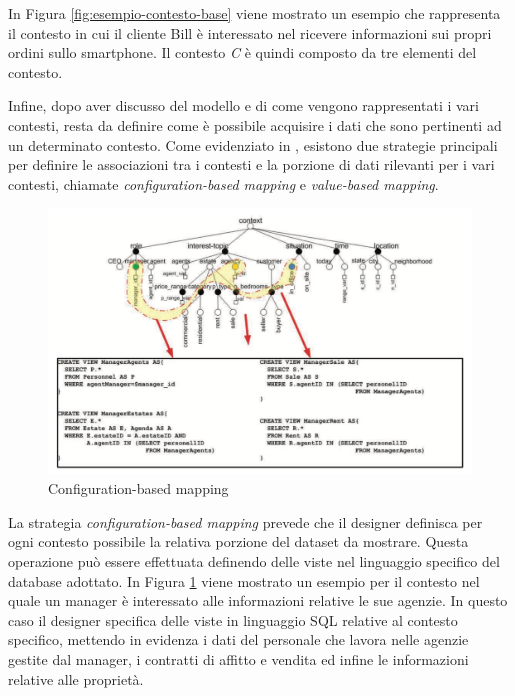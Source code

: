 In Figura \ref{fig:esempio-contesto-base} viene mostrato un esempio che rappresenta il contesto in cui il cliente Bill è interessato nel ricevere informazioni sui propri ordini sullo smartphone. Il contesto \emph{C} è quindi composto da tre elementi del contesto.

Infine, dopo aver discusso del modello e di come vengono rappresentati i vari contesti, resta da definire come è possibile acquisire i dati che sono pertinenti ad un determinato contesto. Come evidenziato in \cite{DBLP:journals/cacm/BolchiniCOQRST09}, esistono due strategie principali per definire le associazioni tra i contesti e la porzione di dati rilevanti per i vari contesti, chiamate \emph{configuration-based mapping} e \emph{value-based mapping}.

\begin{figure}[ht]
	\centering
	\includegraphics[width=\textwidth]{2-nozioni-preliminari/Immagini/configuration-based-mapping.png}
	\caption{Configuration-based mapping}\label{fig:configuration-based-mapping}
\end{figure}

La strategia \emph{configuration-based mapping} prevede che il designer definisca per ogni contesto possibile la relativa porzione del dataset da mostrare. Questa operazione può essere effettuata definendo delle viste nel linguaggio specifico del database adottato. In Figura \ref{fig:configuration-based-mapping} viene mostrato un esempio per il contesto nel quale un manager è interessato alle informazioni relative le sue agenzie. In questo caso il designer specifica delle viste in linguaggio SQL relative al contesto specifico, mettendo in evidenza i dati del personale che lavora nelle agenzie gestite dal manager, i contratti di affitto e vendita ed infine le informazioni relative alle proprietà.

